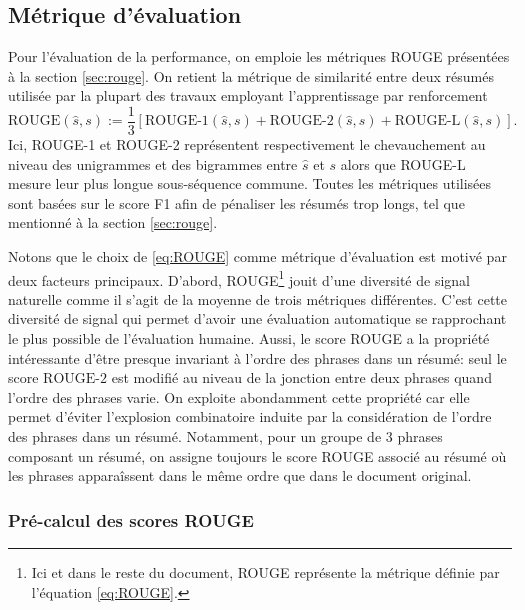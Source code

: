 \subsection{Métrique d'évaluation}
\label{subsec:eval}

Pour l'évaluation de la performance, on emploie les métriques ROUGE \citep{lin-2004-rouge}
présentées à la section \ref{sec:rouge}.
On retient la métrique de similarité entre deux résumés
utilisée par la plupart des travaux employant l'apprentissage par renforcement 
\citep{DBLP:journals/corr/PaulusXS17,dong2018banditsum,luo-etal-2019-reading}
\begin{equation}
    \text{ROUGE}(\hat{s}, s) := \frac{1}{3} \left[ \text{ROUGE-1}(\hat{s}, s) + \text{ROUGE-2}(\hat{s}, s) + \text{ROUGE-L}(\hat{s}, s) \right].
    \label{eq:ROUGE}
\end{equation}
Ici, ROUGE-1 et ROUGE-2 représentent respectivement le chevauchement au niveau des unigrammes 
et des bigrammes entre $\hat{s}$ et $s$ alors que ROUGE-L mesure leur plus longue 
sous-séquence commune.
Toutes les métriques utilisées sont 
basées sur le score F1 afin de pénaliser les résumés trop longs, 
tel que mentionné à la section \ref{sec:rouge}.

Notons que le choix de \eqref{eq:ROUGE} comme métrique d'évaluation est motivé par deux facteurs principaux.
D'abord, ROUGE\footnote{Ici et dans le reste du document, 
ROUGE représente la métrique définie par l'équation \eqref{eq:ROUGE}.} jouit d'une diversité de signal naturelle 
comme il s'agit de la moyenne de trois métriques différentes.
C'est cette diversité de signal
qui permet d'avoir une évaluation automatique se rapprochant le plus
possible de l'évaluation humaine.
Aussi, le score ROUGE a la propriété intéressante d'être presque invariant 
à l'ordre des phrases dans un résumé: seul le score $\text{ROUGE-2}$ est 
modifié au niveau de la jonction entre deux phrases quand l'ordre 
des phrases varie.
On exploite abondamment cette propriété car elle permet d'éviter 
l'explosion combinatoire induite par la considération de l'ordre 
des phrases dans un résumé.
Notamment, pour un groupe de 3 phrases composant un résumé, 
on assigne toujours le score ROUGE associé au résumé où les phrases 
apparaîssent dans le même ordre que dans le document original.

\subsubsection*{Pré-calcul des scores ROUGE}

